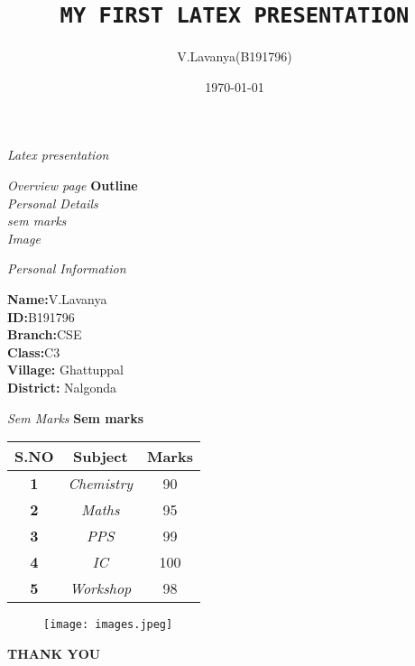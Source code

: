 \documentclass{beamer}
\title{\texttt{MY FIRST LATEX PRESENTATION}}
\author{V.Lavanya(B191796)}
\date{\today}
\begin{document}
\begin{frame}{\textsl{Latex presentation}}
    \titlepage
\end{frame}
\begin{frame}{\textsl{Overview page}}
\centering
    \textbf{Outline}\\
    \vspace{0.2cm}
\centering
\textsl{Personal Details}\\
\vspace{0.2cm}
\centering
\textsl{sem marks}\\
\vspace{0.2cm}
\centering
\textsl{Image}
\end{frame}
\begin{frame}{\textsl{Personal Information}}
\begin{block}
\centering
     \textbf{Name:}V.Lavanya\\
     \textbf{ID:}B191796\\
    \textbf{Branch:}CSE\\
    \textbf{Class:}C3\\
    \textbf{Village:} Ghattuppal \\
    \textbf{District:} Nalgonda \\
\end{block}
\end{frame}
\begin{frame}{\textsl{Sem Marks}}
\centering
\textbf{Sem marks}\\
\vspace{0.3cm}
\begin{tabular}{|c|c|c|} \hline

\textbf{S.NO} & \textbf{Subject}   &  \textbf{Marks}\\
  \hline
  \textbf{1} & \textit{Chemistry}  & 90\\
   \hline
   \textbf{2} & \textit{Maths} & 95\\
   \hline
   \textbf{3} & \textit{PPS}& 99\\
   \hline
   \textbf{4} & \textit{IC} & 100\\
   \hline
   \textbf{5} & \textit{Workshop} & 98\\
   \hline
\end{tabular}
\end{frame}
\begin{frame}
    \begin{figure}
        \centering
        \texttt{[image: images.jpeg]}
    \end{figure}
\end{frame}
\begin{frame}
    \centering
    \textbf{\huge{THANK YOU}}
\end{frame}
\end{document}
